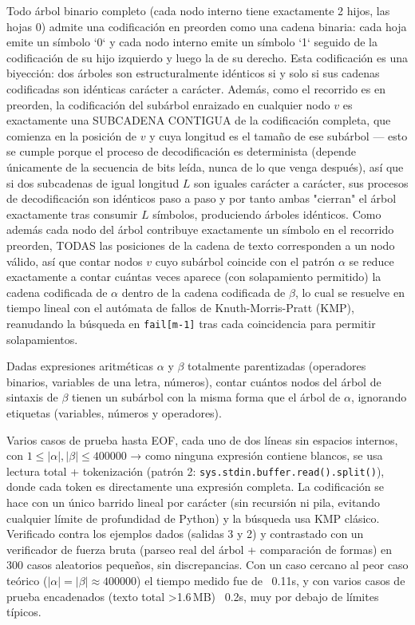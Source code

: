  Todo árbol binario completo (cada nodo interno tiene exactamente 2 hijos, las hojas 0) admite una codificación en preorden como una cadena binaria: cada hoja emite un símbolo `0` y cada nodo interno emite un símbolo `1` seguido de la codificación de su hijo izquierdo y luego la de su derecho. Esta codificación es una biyección: dos árboles son estructuralmente idénticos si y solo si sus cadenas codificadas son idénticas carácter a carácter. Además, como el recorrido es en preorden, la codificación del subárbol enraizado en cualquier nodo $v$ es exactamente una SUBCADENA CONTIGUA de la codificación completa, que comienza en la posición de $v$ y cuya longitud es el tamaño de ese subárbol — esto se cumple porque el proceso de decodificación es determinista (depende únicamente de la secuencia de bits leída, nunca de lo que venga después), así que si dos subcadenas de igual longitud $L$ son iguales carácter a carácter, sus procesos de decodificación son idénticos paso a paso y por tanto ambas "cierran" el árbol exactamente tras consumir $L$ símbolos, produciendo árboles idénticos. Como además cada nodo del árbol contribuye exactamente un símbolo en el recorrido preorden, TODAS las posiciones de la cadena de texto corresponden a un nodo válido, así que contar nodos $v$ cuyo subárbol coincide con el patrón $\alpha$ se reduce exactamente a contar cuántas veces aparece (con solapamiento permitido) la cadena codificada de $\alpha$ dentro de la cadena codificada de $\beta$, lo cual se resuelve en tiempo lineal con el autómata de fallos de Knuth-Morris-Pratt (KMP), reanudando la búsqueda en \texttt{fail[m-1]} tras cada coincidencia para permitir solapamientos.~\cite{knuth1977}


Dadas expresiones aritméticas $\alpha$ y $\beta$ totalmente parentizadas (operadores binarios, variables de una letra, números), contar cuántos nodos del árbol de sintaxis de $\beta$ tienen un subárbol con la misma forma que el árbol de $\alpha$, ignorando etiquetas (variables, números y operadores).

 Varios casos de prueba hasta EOF, cada uno de dos líneas sin espacios internos, con $1 \le |\alpha|, |\beta| \le 400000$ → como ninguna expresión contiene blancos, se usa lectura total + tokenización (patrón 2: \texttt{sys.stdin.buffer.read().split()}), donde cada token es directamente una expresión completa. La codificación se hace con un único barrido lineal por carácter (sin recursión ni pila, evitando cualquier límite de profundidad de Python) y la búsqueda usa KMP clásico. Verificado contra los ejemplos dados (salidas 3 y 2) y contrastado con un verificador de fuerza bruta (parseo real del árbol + comparación de formas) en 300 casos aleatorios pequeños, sin discrepancias. Con un caso cercano al peor caso teórico ($|\alpha|=|\beta|\approx 400000$) el tiempo medido fue de ~0.11s, y con varios casos de prueba encadenados (texto total >1.6\,MB) ~0.2s, muy por debajo de límites típicos.

